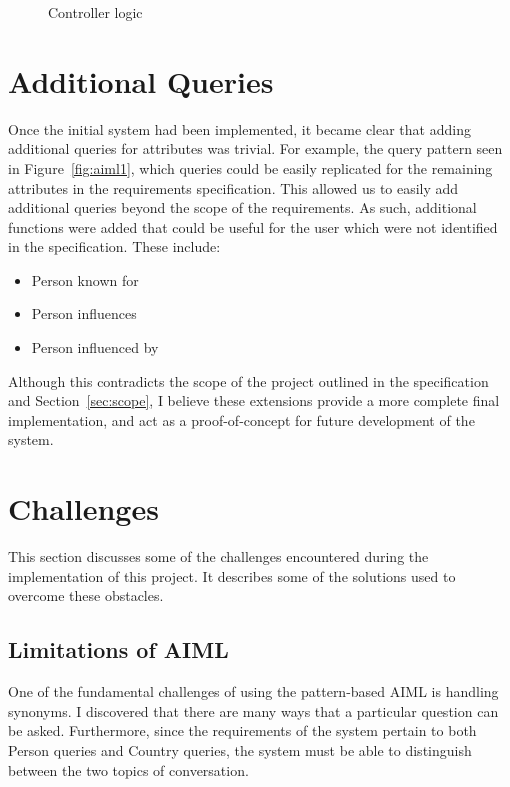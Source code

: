 \begin{figure}[h]
	\centering
	\qquad
	\caption{Controller logic}
	\label{fig:controller}
\end{figure}

\newpage
\section{Additional Queries}
Once the initial system had been implemented, it became clear that adding additional queries for attributes was trivial. For example, the query pattern seen in Figure~\ref{fig:aiml1}, which queries  could be easily replicated for the remaining attributes in the requirements specification. This allowed us to easily add additional queries beyond the scope of the requirements. As such, additional functions were added that could be useful for the user which were not identified in the specification. These include:
\begin{itemize}
	\item Person known for
	\item Person influences
	\item Person influenced by
\end{itemize}
Although this contradicts the scope of the project outlined in the specification and Section~\ref{sec:scope}, I believe these extensions provide a more complete final implementation, and act as a proof-of-concept for future development of the system.


\section{Challenges}
This section discusses some of the challenges encountered during the implementation of this project. It describes some of the solutions used to overcome these obstacles.

\subsection{Limitations of AIML}
One of the fundamental challenges of using the pattern-based AIML is handling synonyms. I discovered that there are many ways that a particular question can be asked. Furthermore, since the requirements of the system pertain to both Person queries and Country queries, the system must be able to distinguish between the two topics of conversation.

